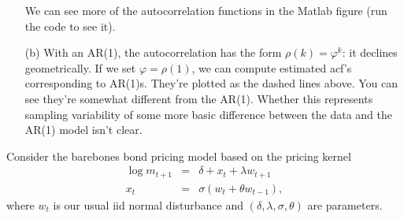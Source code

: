 \documentclass[11pt]{exam}
\begin{document}
\begin{questions}
\begin{solution}
\begin{enumerate}
We can see more of the autocorrelation functions in the Matlab figure
(run the code to see it).
%

\item[(b)] With an AR(1), the autocorrelation has the form
$\rho(k) = \varphi^k$:  it declines geometrically.
If we set $\varphi = \rho(1)$, we can compute
estimated acf's corresponding to AR(1)s.
They're plotted as the dashed lines above.
You can see they're somewhat different from the AR(1).
Whether this represents sampling variability of some more
basic difference between the data and the AR(1) model isn't clear.


\end{enumerate}
\end{solution}

Consider the barebones bond pricing model
based on the pricing kernel
\begin{eqnarray*}
    \log m_{t+1} &=& \delta + x_t + \lambda w_{t+1} \\
    x_{t}     &=& \sigma( w_{t} + \theta w_{t-1})  ,
\end{eqnarray*}
where $w_t$ is our usual iid normal disturbance
and $(\delta,\lambda,\sigma,\theta)$ are parameters.



\end{questions}
\end{document}
